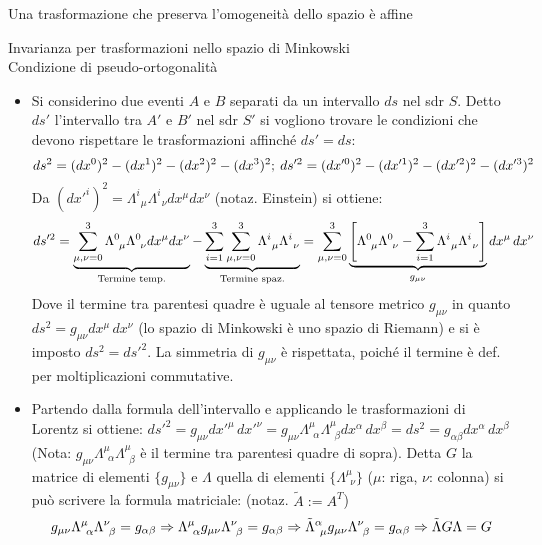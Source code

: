 \documentclass[a4_2,grid,frame]{flashcards}
\newenvironment{cartaflash}
    {\vspace{-15pt}
    \begin{itemize}
    }
    {
    \end{itemize}
    }
\begin{document}
\begin{flashcard}[Approfondimento]{Una trasformazione che preserva l'omogeneità dello spazio è affine}
\end{flashcard}

\begin{flashcard}[Proposizione]{Invarianza per trasformazioni nello spazio di Minkowski\\Condizione di pseudo-ortogonalità}
\begin{cartaflash}
\item Si considerino due eventi $A$ e $B$ separati da un intervallo $ds$ nel sdr $S$. Detto $ds'$ l'intervallo tra $A'$ e $B'$ nel sdr $S'$ si vogliono trovare le condizioni che devono rispettare le trasformazioni affinché $ds' = ds$:
\vspace{-10pt}
\[
ds^2 = (dx^0)^2 - (dx^1)^2 - (dx^2)^2 - (dx^3)^2;\> ds'^2 = (dx'^0)^2 - (dx'^1)^2 - (dx'^2)^2 - (dx'^3)^2
\vspace{-10pt}
\]
Da $(dx'^i)^2 = \Lambda_{\>\>\mu}^i \Lambda_{\>\>\nu}^i dx^\mu dx^\nu$ (notaz. Einstein) si ottiene:
\vspace{-10pt}
\[
ds'^2 = \underbrace{\sum_{\mu,\nu = 0}^3 \Lambda_{\>\>\mu}^0 \Lambda_{\>\>\nu}^0 dx^\mu dx^\nu}_{\text{Termine temp.}}
- \underbrace{\sum_{i=1}^3 \sum_{\mu,\nu=0}^3 \Lambda^i_{\>\>\mu} \Lambda^i_{\>\>\nu}}_{\text{Termine spaz.}} 
= \sum_{\mu,\nu = 0}^3 \underbrace{\left [ \Lambda_{\>\>\mu}^0\Lambda_{\>\>\nu}^0 - \sum_{i=1}^3 \Lambda_{\>\>\mu}^i \Lambda_{\>\>\nu}^i \right ]}_{g_{\mu\nu}} dx^\mu \,dx^\nu
\vspace{-10pt}
\]
Dove il termine tra parentesi quadre è uguale al tensore metrico $g_{\mu\nu}$ in quanto $ds^2 = g_{\mu\nu}dx^\mu\,dx^\nu$ (lo spazio di Minkowski è uno spazio di Riemann) e si è imposto $ds^2 = ds'^2$. 
La simmetria di $g_{\mu\nu}$ è rispettata, poiché il termine è def. per moltiplicazioni commutative.
\vspace{-7pt}
\item Partendo dalla formula dell'intervallo e applicando le trasformazioni di Lorentz si ottiene: $ds'^2 = g_{\mu\nu}dx'^\mu\,dx'^\nu = g_{\mu\nu} \Lambda_{\>\>\alpha}^\mu \Lambda_{\>\>\beta}^\mu dx^\alpha\,dx^\beta = ds^2 = g_{\alpha\beta} dx^\alpha\,dx^\beta$ (Nota: $g_{\mu\nu}\Lambda_{\>\>\alpha}^\mu \Lambda_{\>\>\beta}^\mu$ è il termine tra parentesi quadre di sopra). Detta $G$ la matrice di elementi $\{ g_{\mu\nu}\}$ e $\Lambda$ quella di elementi $\{\Lambda^\mu_{\>\>\nu}\}$ ($\mu$: riga, $\nu$: colonna) si può scrivere la formula matriciale: (notaz. $\tilde{A} := A^T$)
\vspace{-10pt}
\[
g_{\mu\nu}\Lambda^\mu_{\>\>\alpha}\Lambda^\nu_{\>\>\beta} = g_{\alpha\beta} \Rightarrow \Lambda^\mu_{\>\>\alpha} g_{\mu\nu} \Lambda_{\>\>\beta}^\nu = g_{\alpha\beta} \Rightarrow \tilde{\Lambda}_{\>\>\mu}^\alpha g_{\mu\nu} \Lambda_{\>\>\beta}^\nu = g_{\alpha\beta} \Rightarrow \tilde{\Lambda}G\Lambda = G
\vspace{-10pt}
\]

\end{cartaflash}
\end{flashcard}
\end{document}
